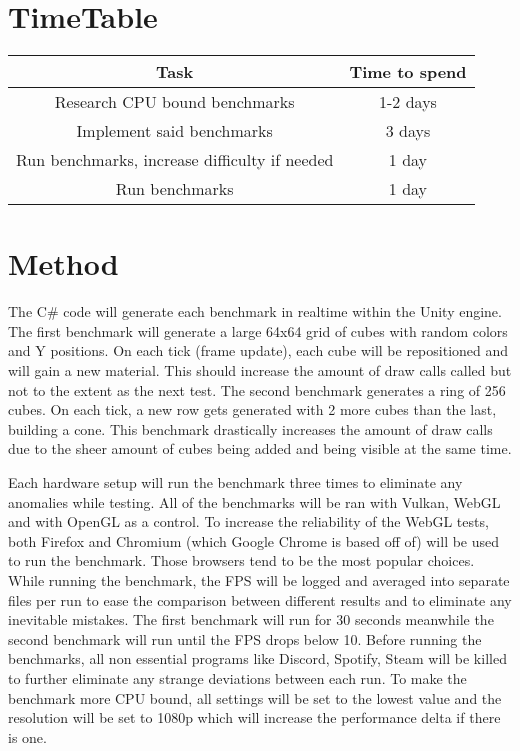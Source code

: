 \documentclass{article}
\begin{document}
\section {TimeTable}
\begin{center}
\begin{tabular}{ |c|c| }
\hline
\textbf {Task} & \textbf {Time to spend} \\
\hline
Research CPU bound benchmarks & 1-2 days \\
\hline
Implement said benchmarks & 3 days \\
\hline
Run benchmarks, increase difficulty if needed & 1 day \\
\hline
Run benchmarks & 1 day \\
\hline
\end{tabular}
\end{center}


\section {Method}
The C\# code will generate each benchmark in realtime within the Unity engine. The first benchmark will generate a large 64x64 grid of cubes with random colors and Y positions. On each tick (frame update), each cube will be repositioned and will gain a new material. This should increase the amount of draw calls called but not to the extent as the next test. The second benchmark generates a ring of 256 cubes. On each tick, a new row gets generated with 2 more cubes than the last, building a cone. This benchmark drastically increases the amount of draw calls due to the sheer amount of cubes being added and being visible at the same time.

Each hardware setup will run the benchmark three times to eliminate any anomalies while testing. All of the benchmarks will be ran with Vulkan, WebGL and with OpenGL as a control. To increase the reliability of the WebGL tests, both Firefox and Chromium (which Google Chrome is based off of) will be used to run the benchmark. Those browsers tend to be the most popular choices\cite{WebBrowsers}. While running the benchmark, the FPS will be logged and averaged into separate files per run to ease the comparison between different results and to eliminate any inevitable mistakes. The first benchmark will run for 30 seconds meanwhile the second benchmark will run until the FPS drops below 10. Before running the benchmarks, all non essential programs like Discord, Spotify, Steam will be killed to further eliminate any strange deviations between each run. To make the benchmark more CPU bound, all settings will be set to the lowest value and the resolution will be set to 1080p  which will increase the performance delta if there is one.
\end{document}
